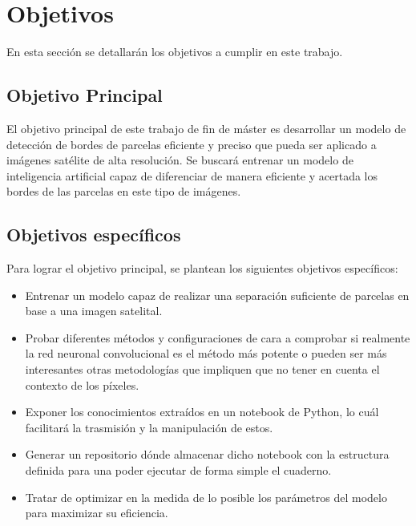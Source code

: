 \chapter{Objetivos}

En esta sección se detallarán los objetivos a cumplir en este trabajo.

\section*{Objetivo Principal}
El objetivo principal de este trabajo de fin de máster es desarrollar un modelo de detección de bordes de parcelas eficiente y preciso que pueda ser aplicado a imágenes satélite de alta resolución. Se buscará entrenar un modelo de inteligencia artificial capaz de diferenciar de manera eficiente y acertada los bordes de las parcelas en este tipo de imágenes.

\section*{Objetivos específicos}
Para lograr el objetivo principal, se plantean los siguientes objetivos específicos:

\begin{itemize}
	\item Entrenar un modelo capaz de realizar una separación suficiente de parcelas en base a una imagen satelital. 
	\item Probar diferentes métodos y configuraciones de cara a comprobar si realmente la red neuronal convolucional es el método más potente o pueden ser más interesantes otras metodologías que impliquen que no tener en cuenta el contexto de los píxeles.
	\item Exponer los conocimientos extraídos en un notebook de Python, lo cuál facilitará la trasmisión y la manipulación de estos.
	\item Generar un repositorio dónde almacenar dicho notebook con la estructura definida para una poder ejecutar de forma simple el cuaderno.
	\item Tratar de optimizar en la medida de lo posible los parámetros del modelo para maximizar su eficiencia.
\end{itemize}